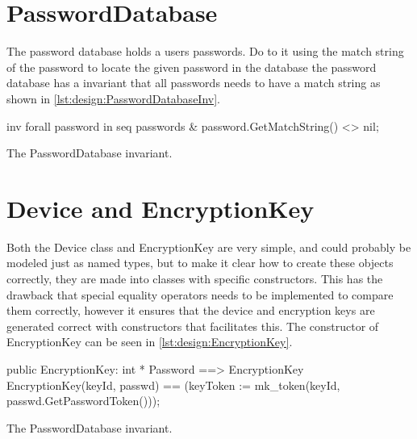 \section{PasswordDatabase}
The password database holds a users passwords. Do to it using the match string of the password to locate the given password in the database the password database has a invariant that all passwords needs to have a match string as shown in \cref{lst:design:PasswordDatabaseInv}.
\begin{listing}[H]
    \begin{vdm_al}
inv forall password in seq passwords & password.GetMatchString() <> nil;
    \end{vdm_al}
    \caption{The {\ttfamily PasswordDatabase} invariant.}
    \label{lst:design:PasswordDatabaseInv}
\end{listing}
\section{Device and EncryptionKey}
Both the Device class and EncryptionKey are very simple, and could probably be modeled just as named types, but to make it clear how to create these objects correctly, they are made into classes with specific constructors. This has the drawback that special equality operators needs to be implemented to compare them correctly, however it ensures that the device and encryption keys are generated correct with constructors that facilitates this. The constructor of EncryptionKey can be seen in \cref{lst:design:EncryptionKey}.
\begin{listing}[H]
    \begin{vdm_al}
public EncryptionKey: int * Password ==> EncryptionKey
    EncryptionKey(keyId, passwd) ==
        (keyToken := mk_token({keyId, passwd.GetPasswordToken()}));
    \end{vdm_al}
    \caption{The {\ttfamily PasswordDatabase} invariant.}
    \label{lst:design:EncryptionKey}
\end{listing}
